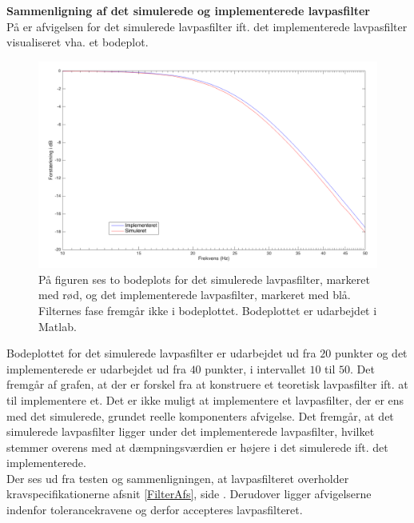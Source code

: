 \textbf{Sammenligning af det simulerede og implementerede lavpasfilter} \\
På  er afvigelsen for det simulerede lavpasfilter ift. det implementerede lavpasfilter visualiseret vha. et bodeplot. 
\begin{figure}[H]
	\centering
	\includegraphics[scale=0.4]{figures/cProblemloesning/sammenligning_sim_imp.PNG}
	\caption{På figuren ses to bodeplots for det simulerede lavpasfilter, markeret med rød, og det implementerede lavpasfilter, markeret med blå. Filternes fase fremgår ikke i bodeplottet. Bodeplottet er udarbejdet i Matlab.}
	\label{fig:sammenligning_sim_imp}
\end{figure} 
Bodeplottet for det simulerede lavpasfilter er udarbejdet ud fra $20$ punkter og det implementerede er udarbejdet ud fra $40$ punkter, i intervallet $10$ til $50$. Det fremgår af grafen, at der er forskel fra at konstruere et teoretisk lavpasfilter ift. at til implementere et. Det er ikke muligt at implementere et lavpasfilter, der er ens med det simulerede, grundet reelle komponenters afvigelse. Det fremgår, at det simulerede lavpasfilter ligger under det implementerede lavpasfilter, hvilket stemmer overens med at dæmpningsværdien er højere i det simulerede ift. det implementerede. \\
Der ses ud fra testen og sammenligningen, at lavpasfilteret overholder kravspecifikationerne afsnit \ref{FilterAfs}, side \pageref{FilterAfs}. Derudover ligger afvigelserne indenfor tolerancekravene og derfor accepteres lavpasfilteret. 